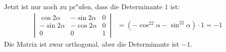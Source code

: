 \begin{loesung}
\begin{teilaufgaben}
Jetzt ist nur noch zu pr"ufen, dass die Determinante $1$ ist:
\begin{align*}
\left|\,
\begin{matrix}
 \cos2\alpha &-\sin2\alpha & 0\\
-\sin2\alpha &-\cos2\alpha & 0\\
      0      &      0      & 1
\end{matrix}\,\right|
&=(-\cos^22\alpha-\sin^22\alpha)\cdot 1=-1
\end{align*}
Die Matrix ist zwar orthogonal, aber die Determinante ist $-1$.
\end{teilaufgaben}
\end{loesung}

